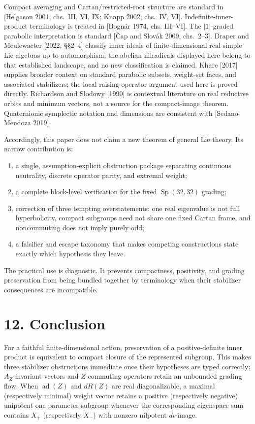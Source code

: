 \documentclass[
  10pt,
  letterpaper,
  oneside]{scrartcl}
\providecommand{\tightlist}{%
  \setlength{\itemsep}{0pt}\setlength{\parskip}{0pt}}
\begin{document}
Compact averaging and Cartan/restricted-root structure are standard in
{[}Helgason 2001, chs.~III, VI, IX; Knapp 2002, chs.~IV, VI{]}.
Indefinite-inner-product terminology is treated in {[}Bognár 1974, chs.
III--VI{]}. The \(|1|\)-graded parabolic interpretation is standard
{[}Čap and Slovák 2009, chs.~2--3{]}. Draper and Meulewaeter {[}2022,
§§2--4{]} classify inner ideals of finite-dimensional real simple Lie
algebras up to automorphism; the abelian nilradicals displayed here
belong to that established landscape, and no new classification is
claimed. Khare {[}2017{]} supplies broader context on standard parabolic
subsets, weight-set faces, and associated stabilizers; the local
raising-operator argument used here is proved directly. Richardson and
Slodowy {[}1990{]} is contextual literature on real reductive orbits and
minimum vectors, not a source for the compact-image theorem.
Quaternionic symplectic notation and dimensions are consistent with
{[}Sedano-Mendoza 2019{]}.

Accordingly, this paper does not claim a new theorem of general Lie
theory. Its narrow contribution is:

\begin{enumerate}
\def\labelenumi{\arabic{enumi}.}
\tightlist
\item
  a single, assumption-explicit obstruction package separating
  continuous neutrality, discrete operator parity, and extremal weight;
\item
  a complete block-level verification for the fixed
  \(\operatorname{Sp}(32,32)\) grading;
\item
  correction of three tempting overstatements: one real eigenvalue is
  not full hyperbolicity, compact subgroups need not share one fixed
  Cartan frame, and noncommuting does not imply purely odd;
\item
  a falsifier and escape taxonomy that makes competing constructions
  state exactly which hypothesis they leave.
\end{enumerate}

The practical use is diagnostic. It prevents compactness, positivity,
and grading preservation from being bundled together by terminology when
their stabilizer consequences are incompatible.

\section{12. Conclusion}\label{conclusion}

For a faithful finite-dimensional action, preservation of a
positive-definite inner product is equivalent to compact closure of the
represented subgroup. This makes three stabilizer obstructions immediate
once their hypotheses are typed correctly: \(A_Z\)-invariant vectors and
\(Z\)-commuting operators retain an unbounded grading flow. When
\(\operatorname{ad}(Z)\) and \(dR(Z)\) are real diagonalizable, a
maximal (respectively minimal) weight vector retains a positive
(respectively negative) unipotent one-parameter subgroup whenever the
corresponding eigenspace sum contains \(X_+\) (respectively \(X_-\))
with nonzero nilpotent \(d\iota\)-image.
\end{document}
